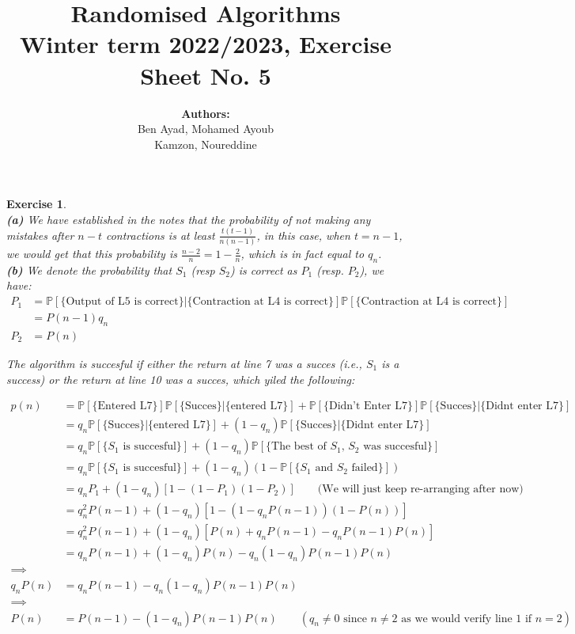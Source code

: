 \documentclass{article}
\title{Randomised Algorithms \\
Winter term 2022/2023, Exercise Sheet No. 5}
\author{
    \textbf{Authors:} \\
    Ben Ayad, Mohamed Ayoub \\
    Kamzon, Noureddine
}
\newtheorem{exo}{Exercise}
\def\P{\mathbb{P}}
\begin{document}
\maketitle

\begin{exo}{\ \\}
\noindent
\textbf{(a)} We have established  in the notes that the probability of not making any mistakes after $n-t$ contractions is at least $\frac{t(t-1)}{n(n-1)}$, in this case, when $t = n-1$, we would get that this probability is $\frac{n-2}{n} = 1 - \frac{2}{n} $, which is in fact equal to $q_n$. \\

\noindent
\textbf{(b)} We denote the probability that $S_1$ (resp $S_2$) is correct as $P_1$ (resp. $P_2$), we have: 
\begin{align*}
P_1 &= \P[\text{\{Output of L5 is correct\}}|\text{\{Contraction at L4 is correct\}}]\P[\text{\{Contraction at L4 is correct\}}] \\
    &= P(n-1) q_n \\
P_2 &= P(n)
\end{align*}

The algorithm is succesful if either the return at line 7 was a succes (i.e., $S_1$ is a success) or  the return at line 10 was a succes, which yiled the following: 

\begin{align*}
    p(n) &= \P[\text{\{Entered L7\}}]\P[\text{\{Succes\}}|\text{\{entered L7\}}]
    + \P[\text{\{Didn't Enter L7\}}]\P[\text{\{Succes\}}|\text{\{Didnt enter L7\}}] \\
         &= q_n \P[\text{\{Succes\}}|\text{\{entered L7\}}]
    + (1-q_n)\P[\text{\{Succes\}}|\text{\{Didnt enter L7\}}] \\
         &= q_n \P[\text{\{$S_1$ is succesful\}}]
    + (1-q_n)\P[\text{\{The best of $S_1$, $S_2$ was succesful\}}] \\
         &= q_n \P[\text{\{$S_1$ is succesful\}}]
    + (1-q_n)(1 - \P[\text{\{$S_1$ and $S_2$ failed\}}]) \\
         &= q_n P_1 + (1-q_n)[1- (1-P_1)(1-P_2)]  \quad \quad \text{(We will just keep re-arranging after now)} \\
         &= q_n^2 P(n-1) + (1-q_n)[1 - (1-q_nP(n-1))(1-P(n))] \\
         &= q_n^2 P(n-1) + (1-q_n)[P(n) + q_nP(n-1) - q_nP(n-1)P(n)] \\ 
         &= q_nP(n-1) + (1-q_n)P(n) - q_n(1-q_n)P(n-1)P(n) \\ 
    \implies & \\
         q_nP(n)&= q_nP(n-1) - q_n(1-q_n)P(n-1)P(n) \\ 
    \implies & \\
         P(n) &= P(n-1) - (1-q_n)P(n-1)P(n) \quad \quad (q_n \neq 0 \text{ since $n\neq 2$ as we would verify line 1 if $n=2$} )
\end{align*}


\end{exo}
\end{document}
